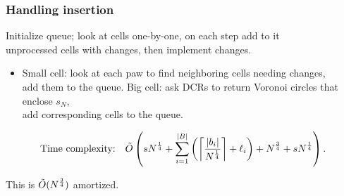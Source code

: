 \begin{frame} \frametitle{Handling insertion}
\vspace{-7mm}
\begin{block}{\vspace*{-3ex}}
	Initialize queue; look at cells one-by-one, on each step add to it \\
	unprocessed cells with changes, then implement changes.
\end{block} \pause

\begin{itemize}
	\item Small cell: look at each paw to find neighboring cells needing changes, \\
	    add them to the queue.
	\mitem Big cell: ask DCRs to return Voronoi circles that enclose $s_N$, \\
	    add corresponding cells to the queue.
\end{itemize} \vspace{-2mm} \pause

\begin{block}{\vspace*{-3ex}} \vspace{-3.6mm}
{\small $$\text{Time complexity:\quad}
\tilde O \left( 
sN^\frac{1}{4} +
\sum_{i=1}^{|B|}  \left(  \left\lceil\frac{|b_i|}{N^\frac{1}{4} }\right\rceil+\ell_i \right)
+ N^\frac{3}{4} + sN^\frac{1}{4}
 \right).
$$} \vspace{-2.6mm} \pause

\centerline{This is $\tilde O(N^\frac{3}{4})$ amortized.}
\end{block}
\end{frame}